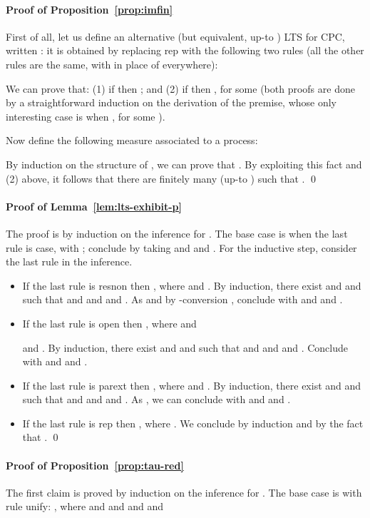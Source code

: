 \documentclass{LMCS}
\begin{document}
\paragraph{Proof of Proposition~\ref{prop:imfin}}
First of all, let us define an alternative (but equivalent, up-to ) LTS
for CPC, written : it is obtained by replacing {\sf rep} with the 
following two rules (all the other rules are the same, with  in place
of  everywhere):

We can prove that: (1) if  then ; and (2)
if  then , for some 
(both proofs are done by a straightforward induction on the derivation of
the premise, whose only interesting case is when , for some ).

Now define the following measure associated to a process:

By induction on the structure of , we can prove that .
By exploiting this fact and (2) above, it follows that there are finitely many (up-to )
 such that .
\qed



\paragraph{Proof of Lemma~\ref{lem:lts-exhibit-p}}
The proof is by induction on the inference for .
The base case is when the last rule is {\sf case}, with ;
conclude by taking  and  and .
For the inductive step, consider the last rule in the inference.
\begin{itemize}
	\item If the last rule is {\sf resnon} then , where
				 and .
				By induction, there exist  and  and  such that 
				 and
				 and 
				 and .
				As  and by -conversion ,
				conclude with  and  and .
	\item If the last rule is {\sf open} then , where
				 and 
				
				and .
				By induction, there exist  and  and  such that 
				 and
				 and
				 and
				.
				Conclude with  and  and .
	\item If the last rule is {\sf parext} then , 
				where 
				and .
				By induction, there exist  and  and  such that 
				 and 
				 and
				 and .
				As , we can
				conclude with  and  and .
	\item If the last rule is {\sf rep} then , 
				where . We conclude by induction
				and by the fact that .
\qed
\end{itemize}

\paragraph{Proof of Proposition~\ref{prop:tau-red}}
The first claim is proved by induction on the inference for .
The base case is with rule {\sf unify}: , where
 and  and 
 and
 and 
\end{document}
